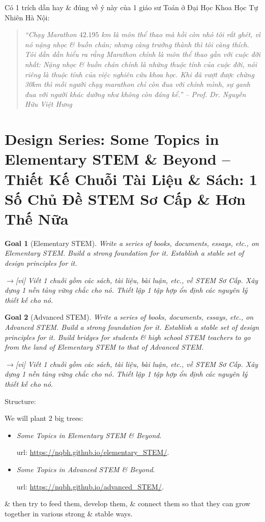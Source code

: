 \documentclass[12pt,oneside]{book}
\newtheorem{goal}{Goal}
\begin{document}
Có 1 trích dẫn hay \& đúng về ý này của 1 giáo sư Toán ở Đại Học Khoa Học Tự Nhiên Hà Nội:
\begin{quote}\it
	``Chạy Marathon $42.195$ km là môn thể thao mà hồi còn nhỏ tôi rất ghét, vì nó nặng nhọc \& buồn chán; nhưng càng trưởng thành thì tôi càng thích. Tôi dần dần hiểu ra rằng Marathon chính là môn thể thao gần với cuộc đời nhất: Nặng nhọc \& buồn chán chính là những thuộc tính của cuộc đời, nói riêng là thuộc tính của việc nghiên cứu khoa học. Khi đã vượt được chừng 30km thì mỗi người chạy marathon chỉ còn đua với chính mình, sự ganh đua với người khác dường như không còn đáng kể.'' -- Prof. Dr. {\sc Nguyễn Hữu Việt Hưng}
\end{quote}

\section{Design Series: Some Topics in Elementary STEM \& Beyond -- Thiết Kế Chuỗi Tài Liệu \& Sách: 1 Số Chủ Đề STEM Sơ Cấp \& Hơn Thế Nữa}

\begin{goal}[Elementary STEM]
	Write a series of books, documents, essays, etc., on Elementary STEM. Build a strong foundation for it. Establish a stable set of design principles for it.
	
	{\sf[en]$\to$[vi]} Viết 1 chuỗi gồm các sách, tài liệu, bài luận, etc., về STEM Sơ Cấp. Xây dựng 1 nền tảng vững chắc cho nó. Thiết lập 1 tập hợp ổn định các nguyên lý thiết kế cho nó.
\end{goal}

\begin{goal}[Advanced STEM]
	Write a series of books, documents, essays, etc., on Advanced STEM. Build a strong foundation for it. Establish a stable set of design principles for it. Build bridges for students \& high school STEM teachers to go from the land of Elementary STEM to that of Advanced STEM.
	
	{\sf[en]$\to$[vi]} Viết 1 chuỗi gồm các sách, tài liệu, bài luận, etc., về STEM Sơ Cấp. Xây dựng 1 nền tảng vững chắc cho nó. Thiết lập 1 tập hợp ổn định các nguyên lý thiết kế cho nó.
\end{goal}

\begin{center}
	{\sf Structure}: 
\end{center}
We will plant 2 big trees:
\begin{itemize}
	\item {\it Some Topics in Elementary STEM \& Beyond}.
	
	{\sc url}: \url{https://nqbh.github.io/elementary_STEM/}.
	\item {\it Some Topics in Advanced STEM \& Beyond}.
	
	{\sc url}: \url{https://nqbh.github.io/advanced_STEM/}.
\end{itemize}
\& then try to feed them, develop them, \& connect them so that they can grow together in various strong \& stable ways.
\end{document}
